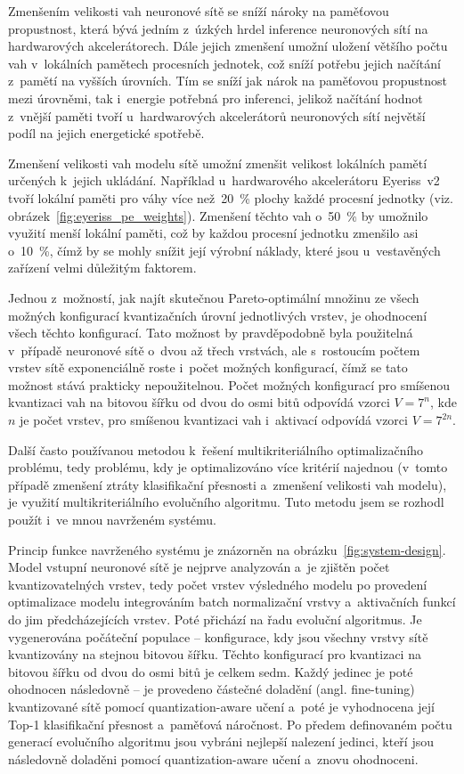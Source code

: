 Zmenšením velikosti vah neuronové sítě se sníží nároky na paměťovou propustnost, která bývá jedním z~úzkých hrdel inference neuronových sítí na hardwarových akcelerátorech. Dále jejich zmenšení umožní uložení většího počtu vah v~lokálních pamětech procesních jednotek, což sníží potřebu jejich načítání z~pamětí na vyšších úrovních. Tím se sníží jak nárok na paměťovou propustnost mezi úrovněmi, tak i~energie potřebná pro inferenci, jelikož načítání hodnot z~vnější paměti tvoří u~hardwarových akcelerátorů neuronových sítí největší podíl na jejich energetické spotřebě.

Zmenšení velikosti vah modelu sítě umožní zmenšit velikost lokálních pamětí určených k~jejich ukládání. Například u~hardwarového akcelerátoru Eyeriss~v2 tvoří lokální paměti pro váhy více než~20~\% plochy každé procesní jednotky (viz. obrázek~\ref{fig:eyeriss_pe_weights}). Zmenšení těchto vah o~50~\% by umožnilo využití menší lokální paměti, což by každou procesní jednotku zmenšilo asi o~10~\%, čímž by se mohly snížit její výrobní náklady, které jsou u~vestavěných zařízení velmi důležitým faktorem.

Jednou z~možností, jak najít skutečnou Pareto-optimální množinu ze všech možných konfigurací kvantizačních úrovní jednotlivých vrstev, je ohodnocení všech těchto konfigurací. Tato možnost by pravděpodobně byla použitelná v~případě neuronové sítě o~dvou až třech vrstvách, ale s~rostoucím počtem vrstev sítě exponenciálně roste i~počet možných konfigurací, čímž se tato možnost stává prakticky nepoužitelnou. Počet možných konfigurací pro smíšenou kvantizaci vah na bitovou šířku od dvou do osmi bitů odpovídá vzorci $V = 7^n$, kde $n$ je počet vrstev, pro smíšenou kvantizaci vah i~aktivací odpovídá vzorci $V = 7^{2n}$.

Další často používanou metodou k~řešení multikriteriálního optimalizačního problému, tedy problému, kdy je optimalizováno více kritérií najednou (v~tomto případě zmenšení ztráty klasifikační přesnosti a~zmenšení velikosti vah modelu), je využití multikriteriálního evolučního algoritmu. Tuto metodu jsem se rozhodl použít i~ve mnou navrženém systému.

Princip funkce navrženého systému je znázorněn na obrázku~\ref{fig:system-design}. Model vstupní neuronové sítě je nejprve analyzován a~je zjištěn počet kvantizovatelných vrstev, tedy počet vrstev výsledného modelu po provedení optimalizace modelu integrováním batch normalizační vrstvy a~aktivačních funkcí do jim předcházejících vrstev. Poté přichází na řadu evoluční algoritmus. Je vygenerována počáteční populace -- konfigurace, kdy jsou všechny vrstvy sítě kvantizovány na stejnou bitovou šířku. Těchto konfigurací pro kvantizaci na bitovou šířku od dvou do osmi bitů je celkem sedm. Každý jedinec je poté ohodnocen následovně -- je provedeno částečné doladění (angl. fine-tuning) kvantizované sítě pomocí quantization-aware učení a~poté je vyhodnocena její Top-1 klasifikační přesnost a~paměťová náročnost. Po předem definovaném počtu generací evolučního algoritmu jsou vybráni nejlepší nalezení jedinci, kteří jsou následovně doladěni pomocí quantization-aware učení a~znovu ohodnoceni.

